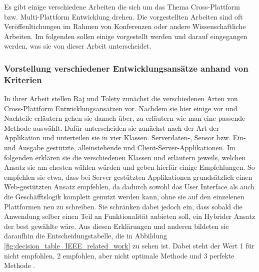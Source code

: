 Es gibt einige verschiedene Arbeiten die sich um das Thema Cross-Plattform bzw. Multi-Plattform Entwicklung drehen. Die vorgestellten Arbeiten sind oft Veröffenltichungen im Rahmen von Konferenzen oder andere Wissenschaftliche Arbeiten. Im folgenden sollen einige vorgestellt werden und darauf eingegangen werden, was sie von dieser Arbeit unterscheidet.

\subsubsection{Vorstellung verschiedener Entwicklungsansätze anhand von Kriterien}
In ihrer Arbeit stellen Raj und Tolety zunächst die verschiedenen Arten von Cross-Plattform Entwicklungsansätzen vor. Nachdem sie hier einige vor und Nachteile erläutern gehen sie danach über, zu erläutern wie man eine passende Methode auswählt. Dafür unterscheiden sie zunächst nach der Art der Applikation und unterteilen sie in vier Klassen. Serverdaten-, Sensor bzw. Ein-und Ausgabe gestützte, alleinstehende und Client-Server-Applikationen. Im folgenden erklären sie die verschiedenen Klassen und erläutern jeweils, welchen Ansatz sie am ehesten wählen würden und geben hierfür einige Empfehlungen. So empfehlen sie etwa, dass bei Server gestützten Applikationen grundsätzlich einen Web-gestützten Ansatz empfehlen, da dadurch sowohl das User Interface als auch die Geschäfftslogik komplett genutzt werden kann, ohne sie auf den einzelenen Plattformen neu zu schreiben. Sie schränken dabei jedoch ein, dass sobald die Anwendung selber einen Teil an Funktionalität anbieten soll, ein Hybrider Ansatz der best gewählte wäre. Aus diesen Erklärungen und anderen bildeten sie daraufhin die Entscheidungstabelle, die in Abbildung \ref{fig:decision_table_IEEE_related_work} zu sehen ist. Dabei steht der Wert 1 für nicht empfohlen, 2 empfohlen, aber nicht optimale Methode und 3 perfekte Methode \cite{IEEE_Rahul_Seshu}.

